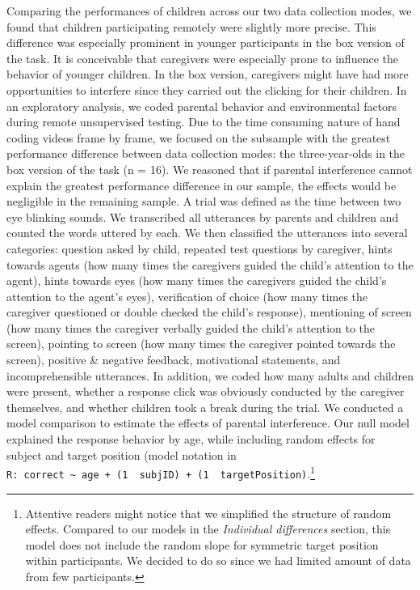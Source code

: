 \documentclass[
  man,floatsintext]{apa6}
\begin{document}
Comparing the performances of children across our two data collection modes, we found that children participating remotely were slightly more precise.
This difference was especially prominent in younger participants in the box version of the task.
It is conceivable that caregivers were especially prone to influence the behavior of younger children.
In the box version, caregivers might have had more opportunities to interfere since they carried out the clicking for their children.
In an exploratory analysis, we coded parental behavior and environmental factors during remote unsupervised testing.
Due to the time consuming nature of hand coding videos frame by frame, we focused on the subsample with the greatest performance difference between data collection modes: the three-year-olds in the box version of the task (n = 16).
We reasoned that if parental interference cannot explain the greatest performance difference in our sample, the effects would be negligible in the remaining sample.
A trial was defined as the time between two eye blinking sounds.
We transcribed all utterances by parents and children and counted the words uttered by each.
We then classified the utterances into several categories: question asked by child, repeated test questions by caregiver, hints towards agents (how many times the caregivers guided the child's attention to the agent), hints towards eyes (how many times the caregivers guided the child's attention to the agent's eyes), verification of choice (how many times the caregiver questioned or double checked the child's response), mentioning of screen (how many times the caregiver verbally guided the child's attention to the screen), pointing to screen (how many times the caregiver pointed towards the screen), positive \& negative feedback, motivational statements, and incomprehensible utterances.
In addition, we coded how many adults and children were present, whether a response click was obviously conducted by the caregiver themselves, and whether children took a break during the trial.
We conducted a model comparison to estimate the effects of parental interference.
Our null model explained the response behavior by age, while including random effects for subject and target position (model notation in \texttt{R:\ correct\ \textasciitilde{}\ age\ +\ (1\ \textbar{}\ subjID)\ +\ (1\ \textbar{}\ targetPosition)}.\footnote{Attentive readers might notice that we simplified the structure of random effects.
  Compared to our models in the \emph{Individual differences} section, this model does not include the random slope for symmetric target position within participants.
  We decided to do so since we had limited amount of data from few participants.}
\end{document}
